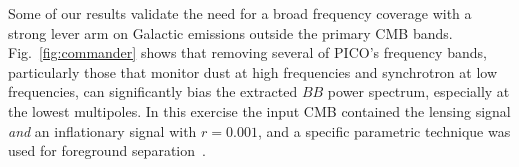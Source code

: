 \documentclass[PICOReport.tex]{subfiles}
\begin{document}



Some of our results validate the need for a broad frequency coverage with a strong lever arm on Galactic emissions outside the primary CMB bands. Fig.~\ref{fig:commander} shows that removing several of PICO's frequency bands, particularly those that monitor dust at high frequencies and synchrotron at low frequencies, can significantly bias the extracted $BB$ power spectrum, especially at the lowest multipoles. In this exercise the input CMB contained the lensing signal {\it and} an inflationary signal with $r=0.001$, and a specific parametric technique was used for foreground separation~\citep{eriksen/etal:2008}. 
\end{document}
